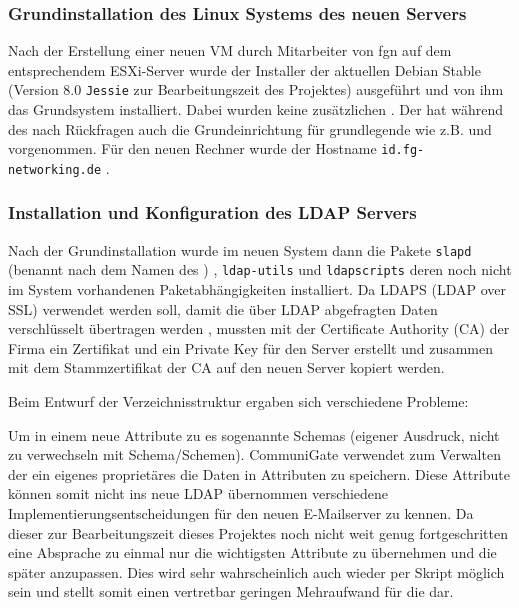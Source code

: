 \documentclass[11pt,a4paper,titlepage=firstiscover]{scrartcl} %
\begin{document}
\subsubsection{Grundinstallation des Linux Systems des neuen Servers}
Nach der Erstellung einer neuen VM durch  Mitarbeiter von 
fgn auf dem entsprechendem ESXi-Server wurde der Installer der aktuellen 
Debian Stable (Version 8.0 \texttt{Jessie} zur Bearbeitungszeit des Projektes) 
ausgeführt und von ihm  das Grundsystem installiert. 
Dabei wurden keine zusätzlichen . Der  hat 
 während des 
 nach Rückfragen auch 
die Grundeinrichtung  für grundlegende 
 wie z.B.   und 
 vorgenommen. Für den neuen Rechner wurde der 
Hostname \texttt{id.fg-networking.de} .

\subsubsection{Installation und Konfiguration des LDAP Servers}
Nach der Grundinstallation wurde im neuen System dann die Pakete \texttt{slapd} 
(benannt nach dem Namen des ) , \texttt{ldap-utils} und 
\texttt{ldapscripts} deren noch nicht im System vorhandenen 
Paketabhängigkeiten installiert. Da LDAPS (LDAP over SSL) verwendet werden soll, 
damit die über LDAP abgefragten Daten verschlüsselt übertragen werden 
, mussten mit der Certificate Authority (CA) der Firma ein 
Zertifikat und ein Private Key für den Server erstellt und zusammen mit dem 
Stammzertifikat der CA auf den neuen Server kopiert werden.

\medskip Beim Entwurf der Verzeichnisstruktur ergaben sich verschiedene Probleme:

\noindent Um in einem  neue Attribute zu  es sogenannte Schemas (eigener Ausdruck, nicht zu verwechseln mit 
Schema/Schemen). CommuniGate verwendet zum Verwalten der 
 ein eigenes proprietäres  
die Daten in  Attributen zu 
speichern. Diese Attribute können somit nicht ins neue LDAP übernommen 
 verschiedene Implementierungsentscheidungen für den neuen 
E-Mailserver zu kennen. Da dieser zur Bearbeitungszeit dieses Projektes noch 
nicht weit genug fortgeschritten  eine Absprache zu 
  einmal nur die wichtigsten 
Attribute zu übernehmen und die  später anzupassen. Dies 
wird sehr wahrscheinlich auch wieder  per Skript 
  möglich 
sein und stellt somit einen vertretbar geringen Mehraufwand für die 
 dar.
\end{document}
